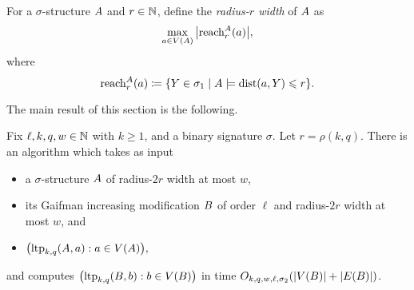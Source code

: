 \begin{definition}\label{def:strucreach}
    For a $\sigma$-structure ${{A}}$ and $r\in\mathbb N$, define 
    the \emph{radius-$r$ width} of ${{A}}$ as 
    $$\max_{a\in V({{A}})}\big|{\rm reach}^{{A}}_r(a)\big|,$$
    where 
    $${\rm reach}^A_r(a) \coloneqq  \{ Y \in \sigma_1 \mid A \models \mathrm{dist}(a,Y) \leqslant r \}.$$
\end{definition}
    

The main result of this section is the following.

\begin{proposition}\label{thm:modification}
    Fix $\ell,k,q,w\in\mathbb N$ with $k\ge 1$, and a binary signature $\sigma$.
    Let $r=\rho(k,q)$.
    There is an algorithm which takes as input 
    \begin{itemize}
         \item a $\sigma$-structure ${{A}}$ of radius-$2r$ width at most $w$,
         \item its Gaifman increasing modification ${{B}}$ of order $\ell$ and radius-\(2r\) width at most \(w\), and
         \item \(\bigl(\textnormal{ltp}_{k,q}({{A}}, a):a\in V({{A}})\bigr),\)
    \end{itemize}
    and computes
    $\bigl(\textnormal{ltp}_{k,q}({{B}}, b):b\in V({{B}})\bigr)$
    in time $O_{k,q,w,\ell,\sigma_2}(|V({{B}})|+|E({{B}})|)$.
\end{proposition}


